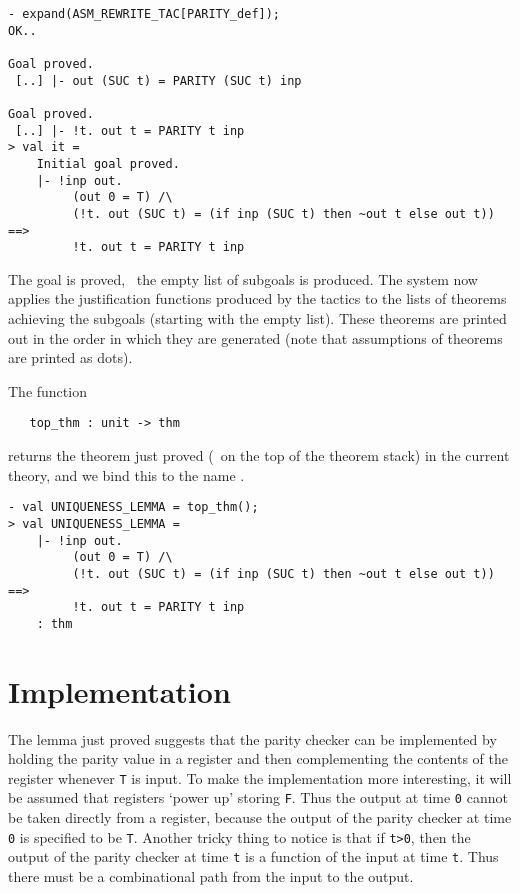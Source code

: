 \begin{session}
\begin{verbatim}
- expand(ASM_REWRITE_TAC[PARITY_def]);
OK..

Goal proved.
 [..] |- out (SUC t) = PARITY (SUC t) inp

Goal proved.
 [..] |- !t. out t = PARITY t inp
> val it =
    Initial goal proved.
    |- !inp out.
         (out 0 = T) /\
         (!t. out (SUC t) = (if inp (SUC t) then ~out t else out t)) ==>
         !t. out t = PARITY t inp
\end{verbatim}
\end{session}

\noindent The goal is proved, \ie\ the empty list of subgoals is produced.
The system now applies the justification functions produced by the
tactics to the lists of theorems achieving the subgoals (starting with
the empty list).  These theorems are printed out in the order in which
they are generated (note that assumptions of theorems are printed as
dots).

The \ML{} function

{\small\begin{verbatim}
   top_thm : unit -> thm
\end{verbatim}}

\noindent
returns the theorem just proved (\ie\ on the top of the theorem stack)
in the current theory, and we bind this to the \ML{} name
.

\begin{session}
\begin{verbatim}
- val UNIQUENESS_LEMMA = top_thm();
> val UNIQUENESS_LEMMA =
    |- !inp out.
         (out 0 = T) /\
         (!t. out (SUC t) = (if inp (SUC t) then ~out t else out t)) ==>
         !t. out t = PARITY t inp
    : thm
\end{verbatim}
\end{session}

\section{Implementation}
\label{implementation}

The lemma just proved suggests that the parity checker can be
implemented by holding the parity value in a register and then
complementing the contents of the register whenever {\small\verb|T|}
is input. To make the implementation more interesting, it will be
assumed that registers `power up' storing {\small\verb|F|}. Thus the
output at time {\small\verb|0|} cannot be taken directly from a
register, because the output of the parity checker at time
{\small\verb|0|} is specified to be {\small\verb|T|}. Another tricky
thing to notice is that if {\small\verb|t>0|}, then the output of the
parity checker at time {\small\verb|t|} is a function of the input at
time {\small\verb|t|}. Thus there must be a combinational path from
the input to the output.

